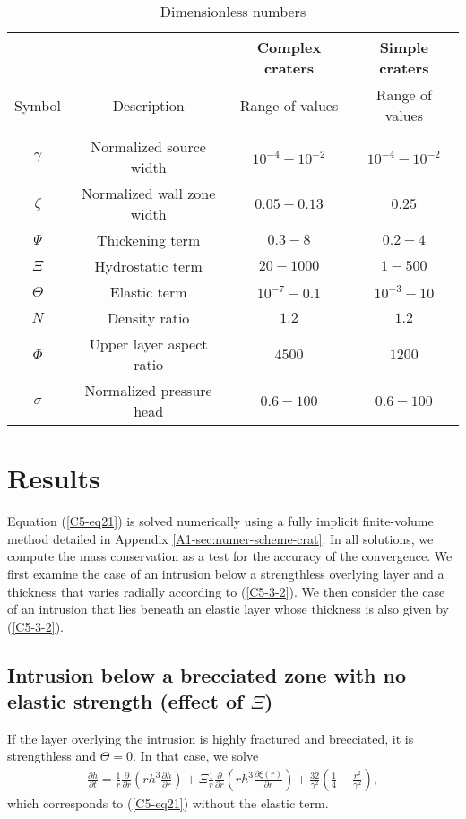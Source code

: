 \begin{table}[h!]
  \caption{Dimensionless numbers}
  \centering
  \begin{tabular}{c|c|c|c}
    &&Complex craters&Simple craters \\
    \hline
    Symbol& Description & Range of values & Range of values \\
    \hline
    &&\\
    $\gamma$&Normalized source width& $10^{-4}-10^{-2}$ &$10^{-4}-10^{-2}$ \\
    $\zeta$& Normalized wall zone width  & $0.05-0.13$&$0.25$\\
    $\Psi$&Thickening term & $0.3-8$&$0.2-4$\\
    $\Xi$& Hydrostatic term & $20-1000$&$1-500$\\
    $\Theta$ &Elastic term & $10^{-7}-0.1$&$10^{-3}-10$\\
    $N$ & Density ratio & $1.2$ &$1.2$\\
    $\Phi$ & Upper layer aspect ratio & $4500$ &$1200 $\\
    $\sigma$&Normalized pressure head& $0.6-100$ & $0.6-100$ 
                                                   \label{C5-tab3}
  \end{tabular} 
\end{table}
	 
	
\section{Results}
	
Equation (\ref{C5-eq21}) is solved  numerically using a fully implicit
finite-volume        method         detailed        in        Appendix
\ref{A1-sec:numer-scheme-crat}.  In all solutions, we compute the mass
conservation as a  test for the accuracy of the  convergence. We first
examine the case of an  intrusion below a strengthless overlying layer
and a thickness  that varies radially according  to (\ref{C5-3-2}). We
then consider  the case of an  intrusion that lies beneath  an elastic
layer whose thickness is also given by (\ref{C5-3-2}).
	
\subsection{Intrusion below a brecciated zone with no elastic strength
  (effect of $\Xi$)}
\label{C5-Strengthless_Layer1}
If  the  layer  overlying  the   intrusion  is  highly  fractured  and
brecciated, it is strengthless and $\Theta=0$.  In that case, we solve
\begin{eqnarray}
  \label{C5-eq22}
  \frac{\partial h}{\partial t}=\frac{1}{r} \frac{\partial}{\partial r}\left (rh^{3} \frac{\partial h}{\partial r} \right)+ \Xi \frac{1}{r} \frac{\partial}{\partial r}\left ( rh^{3}\frac{\partial \xi(r)}{\partial r}\right )+\frac{32}{\gamma^{2}} \left(\frac{1}{4}-\frac{r^{2}}{\gamma^{2}}\right),
\end{eqnarray}
which corresponds to (\ref{C5-eq21}) without the elastic term.

